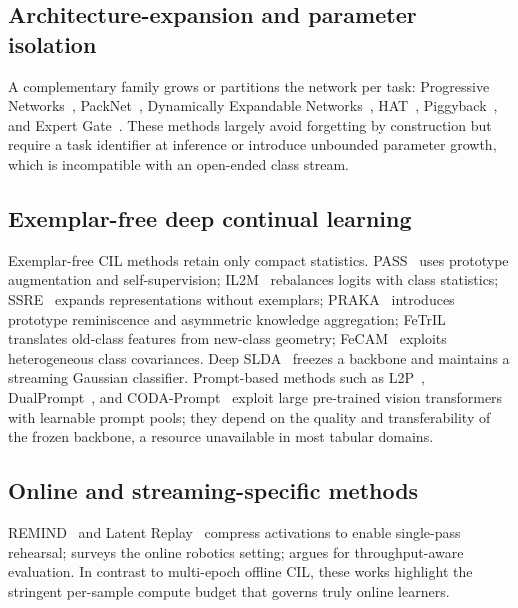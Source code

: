 \documentclass{article}
\begin{document}
\subsection{Architecture-expansion and parameter isolation}
\label{app:related_work:architecture}

A complementary family grows or partitions the network per task:
Progressive Networks~\cite{rusu2016progressive},
PackNet~\cite{mallya2018packnet},
Dynamically Expandable Networks~\cite{yoon2018lifelong},
HAT~\cite{BifetGavalda2009HAT},
Piggyback~\cite{mallya2018piggyback}, and
Expert Gate~\cite{aljundi2017expert}.
These methods largely avoid forgetting by construction but require a task
identifier at inference or introduce unbounded parameter growth, which is
incompatible with an open-ended class stream.

\subsection{Exemplar-free deep continual learning}
\label{app:related_work:exemplar_free}

Exemplar-free CIL methods retain only compact statistics.
PASS~\cite{zhu2021prototype} uses prototype augmentation and self-supervision;
IL2M~\cite{belouadah2019il2m} rebalances logits with class statistics;
SSRE~\cite{zhu2022self} expands representations without exemplars;
PRAKA~\cite{shi2023prototype} introduces prototype reminiscence and asymmetric
knowledge aggregation;
FeTrIL~\cite{petit2023fetril} translates old-class features from new-class geometry;
FeCAM~\cite{goswami2023fecam} exploits heterogeneous class covariances.
Deep SLDA~\cite{hayes2020lifelong} freezes a backbone and maintains a
streaming Gaussian classifier.
Prompt-based methods such as L2P~\cite{wang2022l2p},
DualPrompt~\cite{wang2022dualprompt}, and CODA-Prompt~\cite{smith2023coda}
exploit large pre-trained vision transformers with learnable prompt pools; they
depend on the quality and transferability of the frozen backbone, a resource
unavailable in most tabular domains.

\subsection{Online and streaming-specific methods}
\label{app:related_work:online}

REMIND~\cite{hayes2020remind} and Latent Replay~\cite{pellegrini2020latent}
compress activations to enable single-pass rehearsal;
\cite{lesort2020continual} surveys the online robotics setting;
\cite{ghunaim2023realtime} argues for throughput-aware evaluation.
In contrast to multi-epoch offline CIL, these works highlight the stringent
per-sample compute budget that governs truly online learners.
\end{document}
